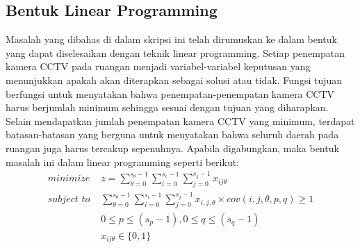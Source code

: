 \subsection{Bentuk Linear Programming}
Masalah yang dibahas di dalam skripsi ini telah dirumuskan ke dalam bentuk yang dapat diselesaikan dengan teknik linear programming. Setiap penempatan kamera CCTV pada ruangan menjadi variabel-variabel keputusan yang menunjukkan apakah akan diterapkan sebagai solusi atau tidak. Fungsi tujuan berfungsi untuk menyatakan bahwa penempatan-penempatan kamera CCTV harus berjumlah minimum sehingga sesuai dengan tujuan yang diharapkan. Selain mendapatkan jumlah penempatan kamera CCTV yang minimum, terdapat batasan-batasan yang berguna untuk menyatakan bahwa seluruh daerah pada ruangan juga harus tercakup sepenuhnya. Apabila digabungkan, maka bentuk masalah ini dalam linear programming seperti berikut:
\begin{equation*}
	\begin{split}
		\textit{minimize } & z = \sum_{\theta=0}^{s_{\theta}-1} \sum_{i=0}^{s_i-1} \sum_{j=0}^{s_j-1} x_{ij\theta}\\
		\textit{subject to } & \sum_{\theta=0}^{s_{\theta}-1} \sum_{i=0}^{s_i-1} \sum_{j=0}^{s_j-1} x_{i,j,\theta} \times cov(i,j,\theta,p,q) \geq 1\\
		& 0 \leq p \leq (s_p - 1), 0 \leq q \leq (s_q - 1)\\
		& x_{ij\theta} \in \{0,1\}
	\end{split}
\end{equation*}


















